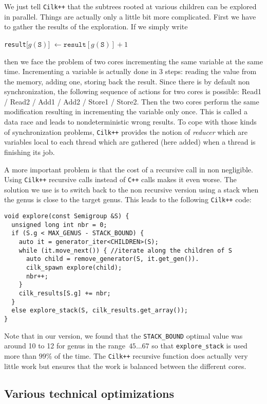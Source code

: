 \documentclass[reqno]{amsart}
\theoremstyle{plain}
\theoremstyle{definition}
\newcommand{\CilkP}{\texttt{Cilk++}\xspace}
\newcommand{\CPP}{\texttt{C++}\xspace}
\renewcommand{\tt}[1]{\texttt{#1}}
\begin{document}
We just tell \CilkP that the subtrees rooted at various children can be
explored in parallel.
Things are actually only a little bit more complicated. First we have to
gather the results of the exploration. If we simply write
\begin{center}
\tt{result}[$g(\tt{S})$] $\gets \tt{result}[g(\tt{S})] + 1$
\end{center}
then we face the problem of two cores incrementing the same variable at the
same time.
 Incrementing a variable is actually done in 3 steps: reading the
value from the memory, adding one, storing back the result. 
Since there is by
default non synchronization, the following sequence of actions for two cores
 is possible: Read1 / Read2 / Add1 / Add2 / Store1 / Store2. Then the two
cores perform the same modification resulting in incrementing the variable
only once. This is called a data race and leads to nondeterministic wrong
results. To cope with those kinds of synchronization problems, \CilkP provides the
notion of \emph{reducer} which are variables local to each thread which are
gathered (here added) when a thread is finishing its job.

A more important problem is that the cost of a recursive call in non
negligible. Using \CilkP recursive calls instead of \CPP calls makes
it even worse. The solution we use is to switch back to the non recursive
version using a stack when the genus is close to the target genus. This leads
to the following \CilkP code:
\vspace{1em}

{\small
\begin{verbatim}
void explore(const Semigroup &S) {
  unsigned long int nbr = 0;
  if (S.g < MAX_GENUS - STACK_BOUND) {
    auto it = generator_iter<CHILDREN>(S); 
    while (it.move_next()) { //iterate along the children of S
      auto child = remove_generator(S, it.get_gen()).
      cilk_spawn explore(child);
      nbr++;
    }
    cilk_results[S.g] += nbr;
  }
  else explore_stack(S, cilk_results.get_array());
}
\end{verbatim}
}
\vspace{1em}

Note that in our version, we found that the \tt{STACK\_BOUND} optimal value was
around 10 to 12 for genus in the range~$45\dots 67$ so that \tt{explore\_stack}
is used more than $99\%$ of the time. The \CilkP recursive function does
actually very little work but ensures that the work is balanced between the
different cores.

\subsection{Various technical optimizations}
\end{document}
